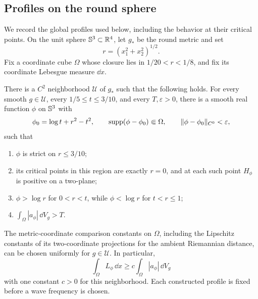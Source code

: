 \subsection{Profiles on the round sphere}

We record the global profiles used below, including the behavior at their
critical points.  On the unit sphere $\mathbb S^3\subset\mathbb R^4$, let $g_*$ be
the round metric and set
\[
 r=(x_1^2+x_2^2)^{1/2}.
\]
Fix a coordinate cube $\Omega$ whose closure lies in
$1/20<r<1/8$, and fix its coordinate Lebesgue measure $\dd x$.

\begin{proposition}
\label{prop:spherical-profiles}
There is a $C^2$ neighborhood $\mathcal U$ of $g_*$ such that the
following holds.  For every smooth $g\in\mathcal U$, every
$1/5\le t\le3/10$, and every $T,\varepsilon>0$, there is a smooth real
function $\phi$ on $\mathbb S^3$ with
\[
 \phi_0=\log t+r^2-t^2,\qquad
 \operatorname{supp}(\phi-\phi_0)\Subset\Omega,
 \qquad \|\phi-\phi_0\|_{C^0}<\varepsilon,
\]
such that
\begin{enumerate}
 \item $\phi$ is strict on $r\le3/10$;
 \item its critical points in this region are exactly $r=0$, and at
 each such point $H_\phi$ is positive on a two-plane;
 \item $\phi>\log r$ for $0<r<t$, while $\phi<\log r$ for
 $t<r\le1$;
 \item $\displaystyle\int_\Omega |a_\phi|\,\dd V_g>T$.
\end{enumerate}
The metric-coordinate comparison constants on $\Omega$, including the
Lipschitz constants of its two-coordinate projections for the ambient
Riemannian distance, can be chosen uniformly for $g\in\mathcal U$.
In particular,
\begin{equation}
 \int_\Omega L_\phi\,\dd x
 \ge c\int_\Omega |a_\phi|\,\dd V_g
 \label{eq:profile-coordinate-mass}
\end{equation}
with one constant $c>0$ for this neighborhood.  Each constructed profile
is fixed before a wave frequency is chosen.
\end{proposition}

